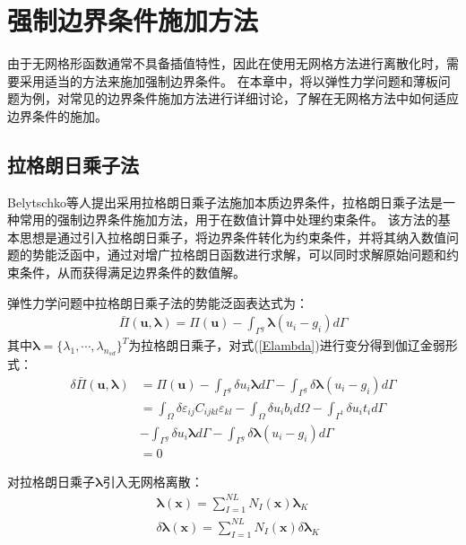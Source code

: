 \chapter{强制边界条件施加方法}
由于无网格形函数通常不具备插值特性，因此在使用无网格方法进行离散化时，需要采用适当的方法来施加强制边界条件。
在本章中，将以弹性力学问题和薄板问题为例，对常见的边界条件施加方法进行详细讨论，了解在无网格方法中如何适应边界条件的施加。

\section{拉格朗日乘子法}
Belytschko等人\cite{}提出采用拉格朗日乘子法施加本质边界条件，拉格朗日乘子法是一种常用的强制边界条件施加方法，用于在数值计算中处理约束条件。
该方法的基本思想是通过引入拉格朗日乘子，将边界条件转化为约束条件，并将其纳入数值问题的势能泛函中，通过对增广拉格朗日函数进行求解，可以同时求解原始问题和约束条件，从而获得满足边界条件的数值解。\par
弹性力学问题中拉格朗日乘子法的势能泛函表达式为：
\begin{equation}\label{Elambda}
\begin{split}
    \bar{\Pi}(\pmb{u},\pmb{\lambda})=\Pi(\pmb{u})-\int_{\Gamma^g}\pmb{\lambda}(u_i-g_i)d\Gamma
\end{split}
\end{equation}   
其中$\pmb{\lambda}=\{\lambda_1,\dotsb,\lambda_{n_{sd}}\}^T$为拉格朗日乘子，对式(\ref{Elambda})进行变分得到伽辽金弱形式：
\begin{equation}\label{Elambda weakform}
\begin{split}
        \delta\bar{\Pi}(\pmb{u},\pmb{\lambda})&=\Pi(\pmb{u})-\int_{\Gamma^g}\delta u_i\pmb{\lambda}d\Gamma-\int_{\Gamma^g}\delta\pmb{\lambda}(u_i-g_i)d\Gamma\\
       &=\int_{\Omega}\delta\varepsilon_{ij}C_{ijkl}\varepsilon_{kl}-\int_{\Omega}\delta u_ib_id\Omega-\int_{\Gamma^t}\delta u_it_id\Gamma\\
       &-\int_{\Gamma^g}\delta u_i\pmb{\lambda}d\Gamma-\int_{\Gamma^g}\delta\pmb{\lambda}(u_i-g_i)d\Gamma\\
       &=0
\end{split}
\end{equation}\par
对拉格朗日乘子$\pmb{\lambda}$引入无网格离散：
\begin{equation}\label{lambdalisan}
\begin{split}
    &\pmb{\lambda}(\pmb{x})=\sum_{I=1}^{N\!L}N_I(\pmb{x})\pmb \lambda_K\\
&\delta\pmb{\lambda}(\pmb{x})=\sum_{I=1}^{N\!L}N_I(\pmb{x})\delta\pmb \lambda_K
\end{split}
\end{equation}

